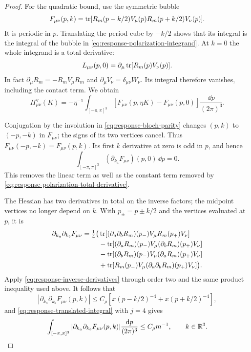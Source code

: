\begin{proof}
For the quadratic bound, use the symmetric bubble
\[
 F_{\mu\nu}(p,k)=
 \operatorname{tr}[R_m(p-k/2)V_\mu(p)R_m(p+k/2)V_\nu(p)].
\]
It is periodic in $p$. Translating the period cube by $-k/2$
shows that its integral is the integral of the bubble in
\eqref{eq:response-polarization-integrand}. At $k=0$ the
whole integrand is a total derivative:
\begin{equation}\label{eq:response-polarization-total-derivative}
 L_{\mu\nu}(p,0)=
    \partial_\mu\operatorname{tr}[R_m(p)V_\nu(p)].
\end{equation}
In fact $\partial_\mu R_m=-R_mV_\mu R_m$ and
$\partial_\mu V_\nu=\delta_{\mu\nu}W_\nu$. Its integral
therefore vanishes, including the contact term. We obtain
\begin{equation}\label{eq:response-polarization-subtracted}
 \Pi^\eta_{\mu\nu}(K)=
     -\eta^{-1}\int_{[-\pi,\pi]^3}
          [F_{\mu\nu}(p,\eta K)-F_{\mu\nu}(p,0)]
                                      \frac{\dd p}{(2\pi)^3}.
\end{equation}

Conjugation by the involution in
\eqref{eq:response-bloch-parity} changes $(p,k)$ to $(-p,-k)$
in $F_{\mu\nu}$; the signs of its two vertices cancel.
Thus $F_{\mu\nu}(-p,-k)=F_{\mu\nu}(p,k)$.
Its first $k$ derivative at zero is odd in $p$, and hence
\begin{equation}\label{eq:response-polarization-parity-cancellation}
 \int_{[-\pi,\pi]^3}
              (\partial_{k_a}F_{\mu\nu})(p,0)\,\dd p=0.
\end{equation}
This removes the linear term as well as the constant term
removed by \eqref{eq:response-polarization-total-derivative}.

The Hessian has two derivatives in total on the inverse factors;
the midpoint vertices no longer depend on $k$. With $p_\pm=p\pm k/2$
and the vertices evaluated at $p$, it is
\begin{align*}
 \partial_{k_a}\partial_{k_b}F_{\mu\nu}
 =\tfrac14\big(&
  \operatorname{tr}[(\partial_a\partial_bR_m)(p_-)V_\mu R_m(p_+)V_\nu]\\
 &-\operatorname{tr}[(\partial_aR_m)(p_-)V_\mu(\partial_bR_m)(p_+)V_\nu]\\
 &-\operatorname{tr}[(\partial_bR_m)(p_-)V_\mu(\partial_aR_m)(p_+)V_\nu]\\
 &+\operatorname{tr}[R_m(p_-)V_\mu(\partial_a\partial_bR_m)(p_+)V_\nu]\big).
\end{align*}
Apply \eqref{eq:response-inverse-derivatives} through order two
and the same product inequality used above. It follows that
\[
 |\partial_{k_a}\partial_{k_b}F_{\mu\nu}(p,k)|
               \le C_\rho[x(p-k/2)^{-4}+x(p+k/2)^{-4}],
\]
and \eqref{eq:response-translated-integral} with $j=4$ gives
\begin{equation}\label{eq:response-polarization-hessian}
 \int_{[-\pi,\pi]^3}
     |\partial_{k_a}\partial_{k_b}F_{\mu\nu}(p,k)|
                             \frac{\mathrm d p}{(2\pi)^3}
                  \le C_\rho m^{-1},\qquad k\in\mathbb R^3.
\end{equation}


\end{proof}
